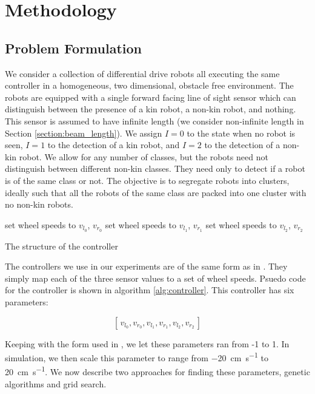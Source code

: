 \documentclass[conference]{IEEEtran}
\begin{document}
\section{Methodology}

  \subsection{Problem Formulation}

    We consider a collection of differential drive robots all executing the same controller in a homogeneous, two dimensional, obstacle free environment. The robots are equipped with a single forward facing line of sight sensor which can distinguish between the presence of a kin robot, a non-kin robot, and nothing. This sensor is assumed to have infinite length (we consider non-infinite length in Section \ref{section:beam_length}). We assign $I=0$ to the state when no robot is seen, $I=1$ to the detection of a kin robot, and $I=2$ to the detection of a non-kin robot. We allow for any number of classes, but the robots need not distinguish between different non-kin classes. They need only to detect if a robot is of the same class or not. The objective is to segregate robots into clusters, ideally such that all the robots of the same class are packed into one cluster with no non-kin robots.

    \begin{algorithm}[t!]
      \begin{algorithmic}
       \State set wheel speeds to $v_{l_0}$, $v_{r_0}$
       \State set wheel speeds to $v_{l_1}$, $v_{r_1}$
      \Else \State set wheel speeds to $v_{l_2}$, $v_{r_2}$
      \EndIf
      \end{algorithmic}
      \caption{The structure of the controller}
      \label{alg:controller}
    \end{algorithm}

    The controllers we use in our experiments are of the same form as in \cite{gauci_self-organized_2014}. They simply map each of the three sensor values to a set of wheel speeds. Psuedo code for the controller is shown in algorithm \ref{alg:controller}. This controller has six parameters:

    $$[\,v_{l_0}, v_{r_0}, v_{l_1}, v_{r_1}, v_{l_2}, v_{r_2}\,]$$

    Keeping with the form used in \cite{gauci_self-organized_2014}, we let these parameters ran from -1 to 1. In simulation, we then scale this parameter to range from \SI{-20}{\centi\meter\per\second} to \SI{20}{\centi\meter\per\second}. We now describe two approaches for finding these parameters, genetic algorithms and grid search.
\end{document}
